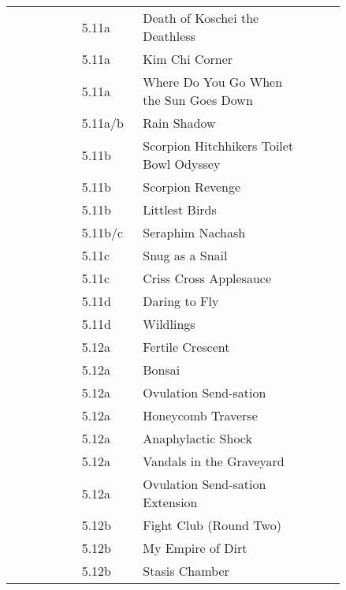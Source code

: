 \begin{flushleft}
\begin{center}
\begin{supertabular}{p{0.18\linewidth}p{0.13\linewidth}p{0.45\linewidth}p{0.08\linewidth}}
&5.11a&Death of Koschei the Deathless & \pageref{rt:Death of Koschei the Deathless} \\
&5.11a&Kim Chi Corner & \pageref{rt:Kim Chi Corner} \\
&5.11a&Where Do You Go When the Sun Goes Down & \pageref{rt:Where Do You Go When the Sun Goes Down} \\
&5.11a/b&Rain Shadow & \pageref{rt:Rain Shadow} \\
&5.11b&Scorpion Hitchhikers Toilet Bowl Odyssey & \pageref{rt:Scorpion Hitchhikers Toilet Bowl Odyssey} \\
&5.11b&Scorpion Revenge & \pageref{rt:Scorpion Revenge} \\
&5.11b&Littlest Birds & \pageref{rt:Littlest Birds} \\
&5.11b/c&Seraphim Nachash & \pageref{rt:Seraphim Nachash} \\
&5.11c&Snug as a Snail & \pageref{rt:Snug as a Snail} \\
&5.11c&Criss Cross Applesauce & \pageref{rt:Criss Cross Applesauce} \\
&5.11d&Daring to Fly & \pageref{rt:Daring to Fly} \\
&5.11d&Wildlings & \pageref{rt:Wildlings} \\
&5.12a&Fertile Crescent & \pageref{rt:Fertile Crescent} \\
&5.12a&Bonsai & \pageref{rt:Bonsai} \\
&5.12a&Ovulation Send-sation & \pageref{rt:Ovulation Send-sation} \\
&5.12a&Honeycomb Traverse & \pageref{vr:Honeycomb Traverse} \\
&5.12a&Anaphylactic Shock & \pageref{rt:Anaphylactic Shock} \\
&5.12a&Vandals in the Graveyard & \pageref{rt:Vandals in the Graveyard} \\
&5.12a&Ovulation Send-sation Extension & \pageref{vr:Ovulation Send-sation Extension} \\
&5.12b&Fight Club (Round Two) & \pageref{rt:Fight Club (Round Two)} \\
&5.12b&My Empire of Dirt & \pageref{rt:My Empire of Dirt} \\
&5.12b&Stasis Chamber & \pageref{rt:Stasis Chamber} \\

\end{supertabular}
\end{center}
\end{flushleft}

